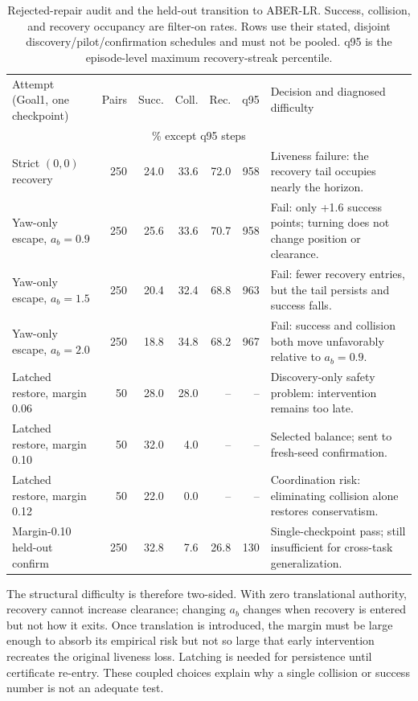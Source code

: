 \documentclass[letterpaper]{article}
\begin{document}
\begin{table}[t]
\centering
\small
\setlength{\tabcolsep}{3.0pt}
\begin{tabular}{p{}rrrrrp{}}
\toprule
Attempt (Goal1, one checkpoint) & Pairs & Succ. & Coll. & Rec. & q95 & Decision and diagnosed difficulty\\
 & & \multicolumn{4}{c}{\% except q95 steps} & \\
\midrule
Strict $(0,0)$ recovery & 250 & 24.0 & 33.6 & 72.0 & 958 & Liveness failure: the recovery tail occupies nearly the horizon.\\
Yaw-only escape, $a_b=0.9$ & 250 & 25.6 & 33.6 & 70.7 & 958 & Fail: only +1.6 success points; turning does not change position or clearance.\\
Yaw-only escape, $a_b=1.5$ & 250 & 20.4 & 32.4 & 68.8 & 963 & Fail: fewer recovery entries, but the tail persists and success falls.\\
Yaw-only escape, $a_b=2.0$ & 250 & 18.8 & 34.8 & 68.2 & 967 & Fail: success and collision both move unfavorably relative to $a_b=0.9$.\\
Latched restore, margin 0.06 & 50 & 28.0 & 28.0 & -- & -- & Discovery-only safety problem: intervention remains too late.\\
Latched restore, margin 0.10 & 50 & 32.0 & 4.0 & -- & -- & Selected balance; sent to fresh-seed confirmation.\\
Latched restore, margin 0.12 & 50 & 22.0 & 0.0 & -- & -- & Coordination risk: eliminating collision alone restores conservatism.\\
Margin-0.10 held-out confirm & 250 & 32.8 & 7.6 & 26.8 & 130 & Single-checkpoint pass; still insufficient for cross-task generalization.\\
\bottomrule
\end{tabular}
\caption{Rejected-repair audit and the held-out transition to ABER-LR.
Success, collision, and recovery occupancy are filter-on rates.  Rows use
their stated, disjoint discovery/pilot/confirmation schedules and must not be
pooled.  q95 is the episode-level maximum recovery-streak percentile.}
\label{tab:rejected-repairs}
\end{table}

The structural difficulty is therefore two-sided.  With zero translational
authority, recovery cannot increase clearance; changing $a_b$ changes when
recovery is entered but not how it exits.  Once translation is introduced,
the margin must be large enough to absorb its empirical risk but not so large
that early intervention recreates the original liveness loss.  Latching is
needed for persistence until certificate re-entry.  These coupled choices
explain why a single collision or success number is not an adequate test.
\end{document}
